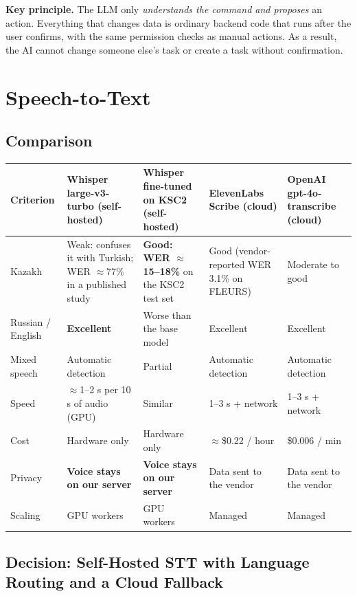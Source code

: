 \documentclass[11pt,a4paper]{article}
\newcommand{\tblstart}{\small\rowcolors{2}{gray!7}{white}}
\begin{document}
\textbf{Key principle.} The LLM only \emph{understands the command and proposes} an action. Everything that changes data is ordinary backend code that runs after the user confirms, with the same permission checks as manual actions. As a result, the AI cannot change someone else's task or create a task without confirmation.

\section{Speech-to-Text}\label{sec:stt}

\subsection{Comparison}

{\tblstart
\begin{xltabular}{\textwidth}{P{2.7cm} L L L L}
\toprule
\textbf{Criterion} & \textbf{Whisper large-v3-turbo (self-hosted)} & \textbf{Whisper fine-tuned on KSC2 (self-hosted)} & \textbf{ElevenLabs Scribe (cloud)} & \textbf{OpenAI gpt-4o-transcribe (cloud)} \\
\midrule
\endhead
Kazakh & Weak: confuses it with Turkish; WER $\approx$77\% in a published study & \textbf{Good: WER $\approx$15--18\%} on the KSC2 test set & Good (vendor-reported WER 3.1\% on FLEURS) & Moderate to good \\
Russian / English & \textbf{Excellent} & Worse than the base model & Excellent & Excellent \\
Mixed speech & Automatic detection & Partial & Automatic detection & Automatic detection \\
Speed & $\approx$1--2 s per 10 s of audio (GPU) & Similar & 1--3 s + network & 1--3 s + network \\
Cost & Hardware only & Hardware only & $\approx$\$0.22 / hour & \$0.006 / min \\
Privacy & \textbf{Voice stays on our server} & \textbf{Voice stays on our server} & Data sent to the vendor & Data sent to the vendor \\
Scaling & GPU workers & GPU workers & Managed & Managed \\
\bottomrule
\end{xltabular}}

\subsection{Decision: Self-Hosted STT with Language Routing and a Cloud Fallback}
\end{document}

